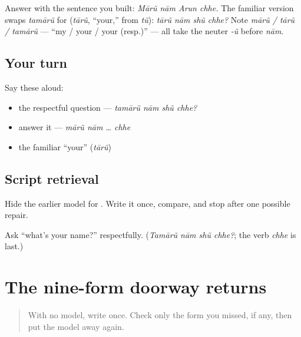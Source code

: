 \begin{grammarlens}[title={Grammar Lens: answering, and the familiar form}]
Answer with the sentence you built: \emph{Mārũ nām Arun chhe.} The familiar version swaps \emph{tamārũ} for \textbf{} (\emph{tārũ}, \textquotedblleft{}your,\textquotedblright{} from \emph{tũ}): \emph{tārũ nām shũ chhe?} Note \emph{mārũ / tārũ / tamārũ} — \textquotedblleft{}my / your / your (resp.)\textquotedblright{} — all take the neuter \emph{-ũ} before \emph{nām}.
\end{grammarlens}

\subsection*{Your turn}
Say these aloud:

\begin{itemize}
\raggedright
  \item the respectful question — \emph{tamārũ nām shũ chhe?}
  \item answer it — \emph{mārũ nām … chhe}
  \item the familiar \textquotedblleft{}your\textquotedblright{} (\emph{tārũ})
\end{itemize}

\subsection*{Script retrieval}
Hide the earlier model for \textbf{}. Write it once, compare, and stop after one possible repair.

\begin{tcolorbox}[breakable,colback=teal!4,colframe=teal!35!black,title={Before you move on}]
Ask \textquotedblleft{}what's your name?\textquotedblright{} respectfully. (\emph{Tamārũ nām shũ chhe?}; the verb \emph{chhe} is last.)
\end{tcolorbox}
\section[ja — o sign — nasal mark — long-ii …]{The nine-form doorway returns}

\label{lesson:GU-R04-doorway-nine-r2}



\begin{quote}
With no model, write \textbf{  } once. Check only the form you missed, if any, then put the model away again.
\end{quote}


